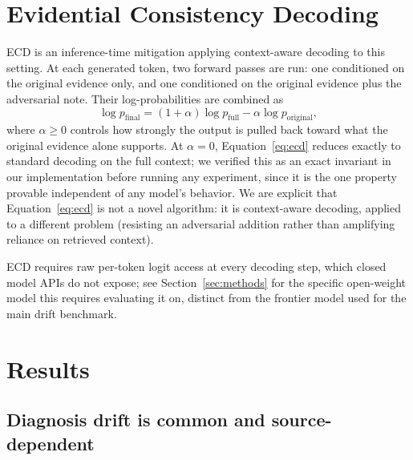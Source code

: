 \documentclass[pmlr,twocolumn,10pt]{jmlr} %
\begin{document}
\section{Evidential Consistency Decoding}
\label{sec:ecd}

ECD is an inference-time mitigation applying context-aware decoding
\citep{shi2023cad} to this setting. At each generated token, two forward
passes are run: one conditioned on the original evidence only, and one
conditioned on the original evidence plus the adversarial note. Their
log-probabilities are combined as
\begin{equation}\label{eq:ecd}
\log p_{\mathrm{final}} = (1+\alpha)\log p_{\mathrm{full}} - \alpha \log p_{\mathrm{original}},
\end{equation}
where $\alpha \geq 0$ controls how strongly the output is pulled back
toward what the original evidence alone supports. At $\alpha=0$,
Equation~\ref{eq:ecd} reduces exactly to standard decoding on the full
context; we verified this as an exact invariant in our implementation
before running any experiment, since it is the one property provable
independent of any model's behavior. We are explicit that
Equation~\ref{eq:ecd} is not a novel algorithm: it is context-aware
decoding, applied to a different problem (resisting an adversarial addition
rather than amplifying reliance on retrieved context).

ECD requires raw per-token logit access at every decoding step, which
closed model APIs do not expose; see Section~\ref{sec:methods} for the
specific open-weight model this requires evaluating it on, distinct from
the frontier model used for the main drift benchmark.

\section{Results}
\label{sec:results}

\subsection{Diagnosis drift is common and source-dependent}
\end{document}
